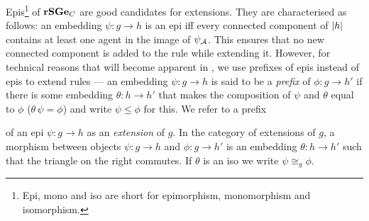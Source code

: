 Epis\footnote{
  Epi, mono and iso are short for
  epimorphism, monomorphism and isomorphism.}
of $\mathbf{rSGe}_C$ are good candidates for extensions. %
They are characterised as follows:
an embedding $\psi: g \to h$ is an epi iff
every connected component of $\left|h\right|$ contains
at least one agent in the image of $\psi_{\mathcal{A}}$.
This ensures that no new connected component is added to the rule
while extending it.
However, for technical reasons
that will become apparent in ,
we use prefixes of epis
instead of epis to extend rules ---
an embedding $\psi: g \to h$ is said to be
a \emph{prefix} of $\phi: g \to h'$
if there is some embedding $\theta: h \to h'$
that makes the composition of $\psi$ and $\theta$ equal to $\phi$
(\ie $\theta \, \psi = \phi$) %
and write $\psi \leq \phi$ for this.
We refer to a prefix
\begin{wrapfigure}[5]{r}{0.27\textwidth}
  \vspace{-2em}
  \begin{center}
  \end{center}
\end{wrapfigure}
of an epi $\psi: g \to h$ as an \emph{extension} of $g$.
In the category of extensions of $g$,
a morphism between objects $\psi: g \to h$ and $\phi: g \to h'$
is an embedding $\theta: h \to h'$
such that the triangle on the right commutes.
If $\theta$ is an iso we write $\psi \cong_g \phi$.

